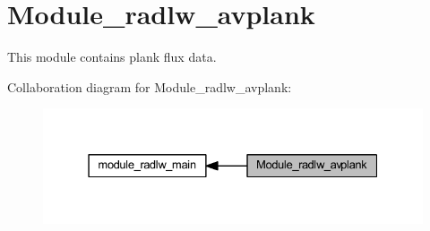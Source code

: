 \hypertarget{group__module__radlw__avplank}{}\section{Module\+\_\+radlw\+\_\+avplank}
\label{group__module__radlw__avplank}


This module contains plank flux data.  


Collaboration diagram for Module\+\_\+radlw\+\_\+avplank\+:\nopagebreak
\begin{figure}[H]
\begin{center}
\leavevmode
\includegraphics[width=331pt]{group__module__radlw__avplank}
\end{center}
\end{figure}
